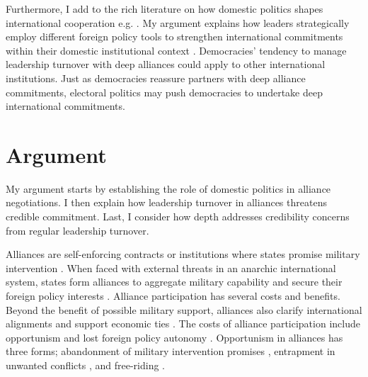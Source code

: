 \documentclass[12pt]{article}
\begin{document}
Furthermore, I add to the rich literature on how domestic politics shapes international cooperation e.g. \citep{DownesRocke1995, Fearon1998, Leeds1999, MattesRodriguez2014}.
My argument explains how leaders strategically employ different foreign policy tools to strengthen international commitments within their domestic institutional context \citep{HydeSaunders2020}.  
Democracies' tendency to manage leadership turnover with deep alliances could apply to other international institutions. 
Just as democracies reassure partners with deep alliance commitments, electoral politics may push democracies to undertake deep international commitments.%




\section{Argument}


My argument starts by establishing the role of domestic politics in alliance negotiations. 
I then explain how leadership turnover in alliances threatens credible commitment. 
Last, I consider how depth addresses credibility concerns from regular leadership turnover. 


Alliances are self-enforcing contracts or institutions where states promise military intervention \citep{Leedsetal2002, Morrow2000}. 
When faced with external threats in an anarchic international system, states form alliances to aggregate military capability and secure their foreign policy interests \citep{Snyder1997, FordhamPoast2014}.
Alliance participation has several costs and benefits.
Beyond the benefit of possible military support, alliances also clarify international alignments \citep{Snyder1997} and support economic ties \citep{Gowa1995, Long2003, Fordham2010, WolfordKim2017}.  
The costs of alliance participation include opportunism and lost foreign policy autonomy \citep{Altfield1984, Morrow2000, Johnson2015}. 
Opportunism in alliances has three forms; abandonment of military intervention promises \citep{BerkemeierFuhrmann2018}, entrapment in unwanted conflicts \citep{Snyder1984}, and free-riding \citep{Morrow2000}.
\end{document}

